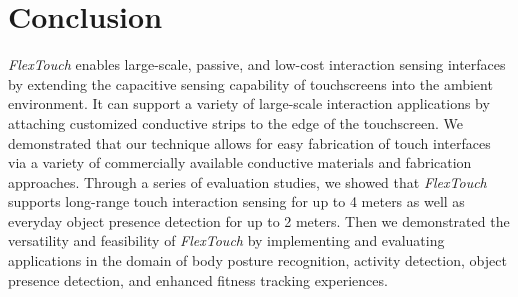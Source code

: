 \section{Conclusion}
\textit{FlexTouch} enables large-scale, passive, and low-cost interaction sensing interfaces by extending the capacitive sensing capability of touchscreens into the ambient environment. It can support a variety of large-scale interaction applications by attaching customized conductive strips to the edge of the touchscreen. We demonstrated that our technique allows for easy fabrication of touch interfaces via a variety of commercially available conductive materials and fabrication approaches. Through a series of evaluation studies, we showed that \textit{FlexTouch} supports long-range touch interaction sensing for up to 4 meters as well as everyday object presence detection for up to 2 meters. Then we demonstrated the versatility and feasibility of \textit{FlexTouch} by implementing and evaluating applications in the domain of body posture recognition, activity detection, object presence detection, and enhanced fitness tracking experiences.